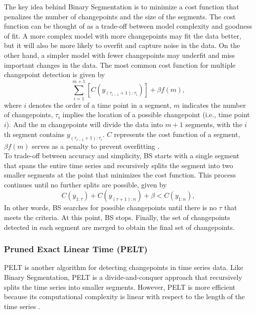 \documentclass[]{interact}
\theoremstyle{plain}%
\theoremstyle{definition}
\theoremstyle{remark}
\begin{document}
	The key idea behind Binary Segmentation is to minimize a cost function that penalizes the number of changepoints and the size of the segments. The cost function can be thought of as a trade-off between model complexity and goodness of fit. A more complex model with more changepoints may fit the data better, but it will also be more likely to overfit and capture noise in the data. On the other hand, a simpler model with fewer changepoints may underfit and miss important changes in the data. The most common cost function for multiple changepoint detection is given by
	\begin{equation} \label{4}
		\sum_{i = 1} ^{m + 1} \left[C(y_{({\tau_{i-1} + 1}):\tau_{i}}) \right] + \beta f(m),
	\end{equation}
	where $i$ denotes the order of a time point in a segment, $m$ indicates the number of changepoints, $\tau_i$ implies the location of a possible changepoint (i.e., time point $i$). And the m changepoints will divide the data into $m+1$ segments, with the $i$th segment contains $y_{({\tau_{i-1} + 1}):\tau_{i}}$. $C$ represents the cost function of a segment, $\beta f(m)$ serves as a penalty to prevent overfitting \cite{killickOptimalDetectionChangepoints2012}. \\
	
	To trade-off between accuracy and simplicity, BS starts with a single segment that spans the entire time series and recursively splits the segment into two smaller segments at the point that minimizes the cost function. This process continues until no further splits are possible, given by
	\begin{equation} \label{5}
		C(y_{1:\tau}) + C(y_{({\tau + 1}):n}) + \beta < C(y_{1:n}),
	\end{equation}
	In other words, BS searches for possible changepoints until there is no $\tau$ that meets the criteria. At this point, BS stops. Finally, the set of changepoints detected in each segment are merged to obtain the final set of changepoints.
	
	\subsubsection{Pruned Exact Linear Time (PELT)} \label{sec:PELT}
	
	
	\hspace{0.23cm} PELT is another algorithm for detecting changepoints in time series data. Like Binary Segmentation, PELT is a divide-and-conquer approach that recursively splits the time series into smaller segments. However, PELT is more efficient because its computational complexity is linear with respect to the length of the time series \cite{killickOptimalDetectionChangepoints2012}. \\
	
\end{document}
